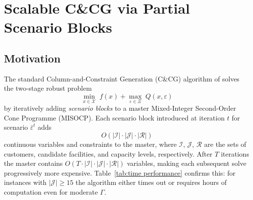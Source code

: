 
\section{Scalable C\&CG via Partial Scenario Blocks}
\label{sec:rpbd}

\subsection{Motivation}
\label{sec:rpbd:motivation}

The standard Column-and-Constraint Generation (C\&CG) algorithm
of \citet{ZengZhao2013} solves the two-stage robust problem
\begin{equation}
  \min_{x \in \mathcal{X}}\; f(x) + \max_{\varepsilon \in \Xi}\; Q(x,\varepsilon)
  \label{eq:robust}
\end{equation}
by iteratively adding \emph{scenario blocks} to a master Mixed-Integer
Second-Order Cone Programme (MISOCP).
Each scenario block introduced at iteration $t$ for scenario
$\bar{\varepsilon}^{t}$ adds
\begin{equation*}
  O\!\left(|\mathcal{I}|\cdot|\mathcal{J}|\cdot|\mathcal{R}|\right)
\end{equation*}
continuous variables and constraints to the master, where
$\mathcal{I}$, $\mathcal{J}$, $\mathcal{R}$ are the sets of
customers, candidate facilities, and capacity levels, respectively.
After $T$ iterations the master contains
$O\!\left(T \cdot |\mathcal{I}|\cdot|\mathcal{J}|\cdot|\mathcal{R}|\right)$
variables, making each subsequent solve progressively more expensive.
Table~\ref{tab:time performance} confirms this: for instances with
$|\mathcal{J}| \ge 15$ the algorithm either times out or requires
hours of computation even for moderate $\Gamma$.

